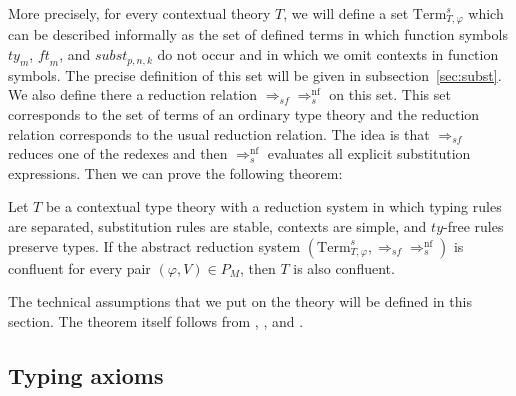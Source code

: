 \documentclass[reqno]{amsart}
\theoremstyle{definition}
\theoremstyle{remark}
\newcommand{\nf}{\mathrm{nf}}
\newcommand{\Term}{\mathrm{Term}}
\newcommand{\subst}{\mathit{subst}}
\newcommand{\ft}{\mathit{ft}}
\newcommand{\ty}{\mathit{ty}}
\numberwithin{figure}{section}
\begin{document}
More precisely, for every contextual theory $T$, we will define a set $\Term_{T,\varphi}^s$ which can be described informally as the set of defined terms
in which function symbols $\ty_m$, $\ft_m$, and $\subst_{p,n,k}$ do not occur and in which we omit contexts in function symbols.
The precise definition of this set will be given in subsection~\ref{sec:subst}.
We also define there a reduction relation $\Rightarrow_{sf} \Rightarrow_s^\nf$ on this set.
This set corresponds to the set of terms of an ordinary type theory and the reduction relation corresponds to the usual reduction relation.
The idea is that $\Rightarrow_{sf}$ reduces one of the redexes and then $\Rightarrow_s^\nf$ evaluates all explicit substitution expressions.
Then we can prove the following theorem:

\begin{thm}
Let $T$ be a contextual type theory with a reduction system in which typing rules are separated, substitution rules are stable, contexts are simple, and $\ty$-free rules preserve types.
If the abstract reduction system $(\Term_{T,\varphi}^s, \Rightarrow_{sf} \Rightarrow_s^\nf)$ is confluent for every pair $(\varphi,V) \in P_M$, then $T$ is also confluent.
\end{thm}

The technical assumptions that we put on the theory will be defined in this section.
The theorem itself follows from , , and .

\subsection{Typing axioms}
\end{document}
